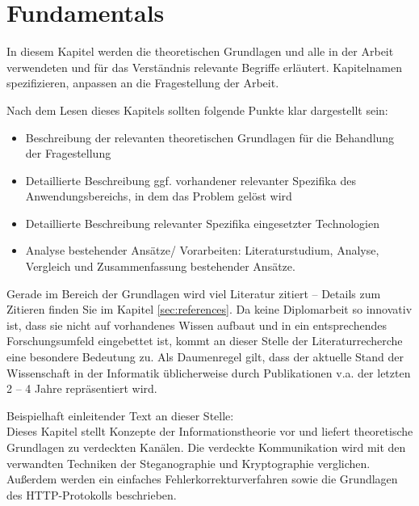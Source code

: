 \chapter{Fundamentals}
\label{sec:fundamentals}

In diesem Kapitel werden die theoretischen Grundlagen und alle in der Arbeit verwendeten und für das Verständnis relevante Begriffe erläutert. Kapitelnamen spezifizieren, anpassen an die Fragestellung der Arbeit.

\makeatletter\ifthesis@masterthesis
Nach dem Lesen dieses Kapitels sollten folgende Punkte klar dargestellt sein:
\begin{itemize}
	\item Beschreibung der relevanten theoretischen Grundlagen für die Behandlung der Fragestellung
	\item Detaillierte Beschreibung ggf. vorhandener relevanter Spezifika des Anwendungsbereichs, in dem das Problem gelöst wird
	\item Detaillierte Beschreibung relevanter Spezifika eingesetzter Technologien
	\item Analyse bestehender Ansätze/ Vorarbeiten: Literaturstudium, Analyse, Vergleich und Zusammenfassung bestehender Ansätze.
\end{itemize}
\fi\makeatother

Gerade im Bereich der Grundlagen wird viel Literatur zitiert -- Details zum Zitieren finden Sie im Kapitel \ref{sec:references}. Da keine Diplomarbeit so innovativ ist, dass sie nicht auf vorhandenes Wissen aufbaut und in ein entsprechendes Forschungsumfeld eingebettet ist, kommt an dieser Stelle der Literaturrecherche eine besondere Bedeutung zu. Als Daumenregel gilt, dass der aktuelle Stand der Wissenschaft in der Informatik üblicherweise durch Publikationen v.a. der letzten 2 – 4 Jahre repräsentiert wird.

\makeatletter\ifthesis@masterthesis
Beispielhaft einleitender Text an dieser Stelle:\\
Dieses Kapitel stellt Konzepte der Informationstheorie vor und liefert theoretische Grundlagen zu verdeckten Kanälen. Die verdeckte Kommunikation wird mit den verwandten Techniken der Steganographie und Kryptographie verglichen. Außerdem werden ein einfaches Fehlerkorrekturverfahren sowie die Grundlagen des HTTP-Protokolls beschrieben.
\fi\makeatother

